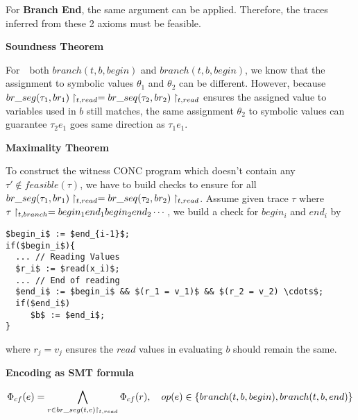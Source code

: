 \documentclass{article}
\begin{document}
\begin{enumerate}
For \textbf{Branch End}, the same argument can be applied.
Therefore, the traces inferred from these 2 axioms must be feasible.

\textbf{Soundness Theorem}

For　both $branch(t, b, begin)$ and $branch(t, b, begin)$,
we know that the assignment to symbolic values $\theta_1$ and $\theta_2$
can be different.
However, because $br\_seg(\tau_1, br_1)\upharpoonright_{t,read} = br\_seq(\tau_2, br_2)\upharpoonright_{t,read}$
ensures the assigned value to variables used in $b$ still matches,
the same assignment $\theta_2$ to symbolic values can guarantee $\tau_2 e_1$
goes same direction as $\tau_1 e_1$.

\textbf{Maximality Theorem}

To construct the witness CONC program which doesn't contain any 
$\tau' \notin feasible(\tau)$,
we have to build checks to ensure for all
$br\_seg(\tau_1, br_1)\upharpoonright_{t,read} = br\_seq(\tau_2, br_2)\upharpoonright_{t,read}$.
Assume given trace $\tau$ where $\tau \upharpoonright_{t, branch} = begin_1end_1begin_2end_2\cdots$,
we build a check for $begin_i$ and $end_i$ by
\begin{lstlisting}
$begin_i$ := $end_{i-1}$;
if($begin_i$){
  ... // Reading Values
  $r_i$ := $read(x_i)$;
  ... // End of reading
  $end_i$ := $begin_i$ && $(r_1 = v_1)$ && $(r_2 = v_2) \cdots$;
  if($end_i$)
     $b$ := $end_i$;
}
\end{lstlisting}
where $r_j = v_j$ ensures the $read$ values in evaluating $b$ should remain the same.

\textbf{Encoding as SMT formula}

$$
\Phi_{cf}(e) = \bigwedge_{r \in br\_seg(t, e) \upharpoonright_{t, read}} \Phi_{cf}(r),
\quad op(e) \in \{branch(t, b, begin), branch(t, b, end)\}
$$

\end{enumerate}
\end{document}
